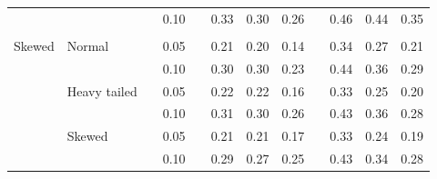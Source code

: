 \documentclass[12pt]{article} %
\begin{document}
\begin{table}[ht]
\begin{scriptsize}
\begin{center}
\begin{tabular}{ll p{.1cm} c p{.1cm} rrr p{.1cm} rrr}
             &              && 0.10 &&   0.33 & 0.30 & 0.26 && 0.46 & 0.44 & 0.35 \\ 
             &&&&&&&&&&&\\
Skewed       & Normal       && 0.05 &&   0.21 & 0.20 & 0.14 && 0.34 & 0.27 & 0.21 \\ 
             &              && 0.10 &&   0.30 & 0.30 & 0.23 && 0.44 & 0.36 & 0.29 \\ 
             & Heavy tailed && 0.05 &&   0.22 & 0.22 & 0.16 && 0.33 & 0.25 & 0.20 \\ 
             &              && 0.10 &&   0.31 & 0.30 & 0.26 && 0.43 & 0.36 & 0.28 \\ 
             & Skewed       && 0.05 &&   0.21 & 0.21 & 0.17 && 0.33 & 0.24 & 0.19 \\ 
             &              && 0.10 &&   0.29 & 0.27 & 0.25 && 0.43 & 0.34 & 0.28 \\ 

\hline
\end{tabular}
\end{center}
\end{scriptsize}
\end{table}
\end{document}
